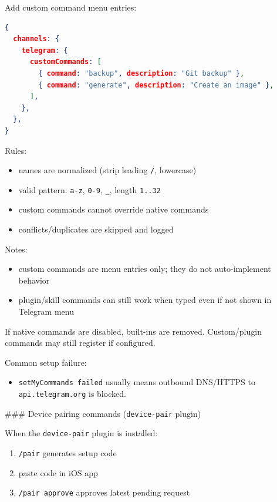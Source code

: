 Add custom command menu entries:

\begin{lstlisting}[language=json]
{
  channels: {
    telegram: {
      customCommands: [
        { command: "backup", description: "Git backup" },
        { command: "generate", description: "Create an image" },
      ],
    },
  },
}
\end{lstlisting}


Rules:

\begin{itemize}
  \item names are normalized (strip leading \texttt{/}, lowercase)
  \item valid pattern: \texttt{a-z}, \texttt{0-9}, \texttt{\_}, length \texttt{1..32}
  \item custom commands cannot override native commands
  \item conflicts/duplicates are skipped and logged
\end{itemize}


Notes:

\begin{itemize}
  \item custom commands are menu entries only; they do not auto-implement behavior
  \item plugin/skill commands can still work when typed even if not shown in Telegram menu
\end{itemize}


If native commands are disabled, built-ins are removed. Custom/plugin commands may still register if configured.

Common setup failure:

\begin{itemize}
  \item \texttt{setMyCommands failed} usually means outbound DNS/HTTPS to \texttt{api.telegram.org} is blocked.
\end{itemize}


\#\#\# Device pairing commands (\texttt{device-pair} plugin)

When the \texttt{device-pair} plugin is installed:

\begin{enumerate}
  \item \texttt{/pair} generates setup code
  \item paste code in iOS app
  \item \texttt{/pair approve} approves latest pending request
\end{enumerate}


